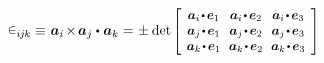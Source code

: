 \begin{otherlanguage}{russian}
\nopagebreak\vspace{-0.2em}
\begin{equation*}
\permutationsparitysymbols{i\hspace{-0.1ex}j\hspace{-0.1ex}k} \hspace{-0.1ex}
\equiv \hspace{.16ex} \bm{a}_i \hspace{-0.25ex} \times \hspace{-0.25ex} \bm{a}_j \dotp \hspace{.1ex} \bm{a}_k =
\hspace{.1ex} \pm \hspace{.1ex} \determinant\hspace{-0.1ex}
\scalebox{0.92}[0.92]{$\left[\hspace{-0.2ex}\begin{array}{c@{\hspace{.64em}}c@{\hspace{.64em}}c}
\bm{a}_i \narrowdotp\hspace{.12ex} \bm{e}_1 & \bm{a}_i \narrowdotp\hspace{.12ex} \bm{e}_2 & \bm{a}_i \narrowdotp\hspace{.12ex} \bm{e}_3 \\
\bm{a}_j \narrowdotp\hspace{.12ex} \bm{e}_1 & \bm{a}_j \narrowdotp\hspace{.12ex} \bm{e}_2 & \bm{a}_j \narrowdotp\hspace{.12ex} \bm{e}_3 \\
\bm{a}_k \narrowdotp\hspace{.12ex} \bm{e}_1 & \bm{a}_k \narrowdotp\hspace{.12ex} \bm{e}_2 & \bm{a}_k \narrowdotp\hspace{.12ex} \bm{e}_3
\end{array}\hspace{-0.12ex}\right]$}
\end{equation*}

\vspace{-0.2em}\noindent
{}


\end{otherlanguage}
